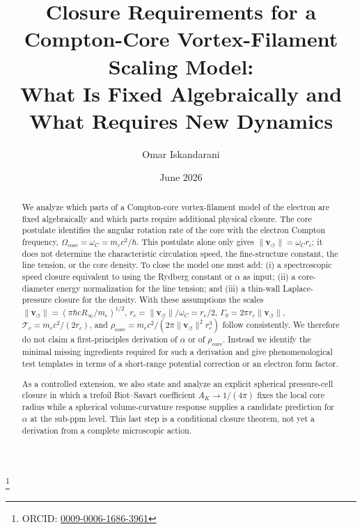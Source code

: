\documentclass[aps,pra,preprint,longbibliography,nofootinbib]{revtex4-2}
\newcommand{\AK}{A_K}                                %
\begin{document}
\title{Closure Requirements for a Compton-Core Vortex-Filament Scaling Model:\\
       What Is Fixed Algebraically and What Requires New Dynamics}

\author{Omar Iskandarani}
\thanks{ORCID: \href{https://orcid.org/0009-0006-1686-3961}{0009-0006-1686-3961}}
\date{June 2026}


\begin{abstract}
We analyze which parts of a Compton-core vortex-filament model of the
electron are fixed algebraically and which parts require additional
physical closure.  The core postulate identifies the angular rotation
rate of the core with the electron Compton frequency,
$\Omega_{\mathrm{core}}=\omega_C=m_e c^2/\hbar$.  This postulate alone
only gives $\lVert \mathbf{v}_{\!\boldsymbol{\circlearrowleft}}\rVert=\omega_C r_c$;
it does not determine the characteristic circulation speed, the
fine-structure constant, the line tension, or the core density.  To close
the model one must add: (i) a spectroscopic speed closure equivalent to
using the Rydberg constant or $\alpha$ as input; (ii) a core-diameter
energy normalization for the line tension; and (iii) a thin-wall
Laplace-pressure closure for the density.  With these assumptions the
scales
$\lVert \mathbf{v}_{\!\boldsymbol{\circlearrowleft}}\rVert=(\pi\hbar cR_\infty/m_e)^{1/2}$,
$r_c=\lVert \mathbf{v}_{\!\boldsymbol{\circlearrowleft}}\rVert/\omega_C=r_e/2$,
$\Gamma_0=2\pi r_c\lVert \mathbf{v}_{\!\boldsymbol{\circlearrowleft}}\rVert$,
$\mathcal{T}_c=m_ec^2/(2r_c)$, and
$\rho_{\mathrm{core}}=m_ec^2/(2\pi\lVert \mathbf{v}_{\!\boldsymbol{\circlearrowleft}}\rVert^2r_c^3)$
follow consistently.  We therefore do not claim a first-principles
derivation of $\alpha$ or of $\rho_{\mathrm{core}}$.  Instead we identify
the minimal missing ingredients required for such a derivation and give
phenomenological test templates in terms of a short-range potential
correction or an electron form factor.

As a controlled extension, we also state and analyze an explicit spherical
pressure-cell closure in which a trefoil Biot--Savart coefficient
$\AK\to1/(4\pi)$ fixes the local core radius while a spherical
volume-curvature response supplies a candidate prediction for $\alpha$ at
the sub-ppm level.  This last step is a conditional closure theorem, not
yet a derivation from a complete microscopic action.

\end{abstract}
\end{document}
